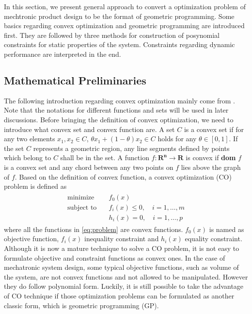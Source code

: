 In this section, we present general approach to convert a optimization problem of mechtronic product design to be the format of geometric programming. Some basics regarding convex optimization and geometric programming are introduced first. They are followed by three methods for construction of posynomial constraints for static properties of the system. Constraints regarding dynamic performance are interpreted in the end. 

\subsection{Mathematical Preliminaries}
The following introduction regarding convex optimization mainly come from \cite{boyd2004convex}. Note that the notations for different functions and sets will be used in later discussions. Before bringing the definition of convex optimization, we need to introduce what convex set and convex function are. A set $C$ is a convex set if for any two elements $x_1, x_2 \in C$, $\theta x_1+(1-\theta) x_2\in C$ holds for any $\theta \in \left[0,1\right]$. If the set $C$ represents a geometric region, any line segments defined by points which belong to $C$ shall be in the set. A function $f : \mathbf{R^n} \to \mathbf{R}$ is convex if \textbf{dom} $f$ is a convex set and any chord between any two points on $f$ lies above the graph of $f$. Based on the definition of convex function, a convex optimization (CO) problem is defined as 
\begin{align}
\begin{split}
\label{eq:problem}
\text{minimize} \quad  & f_0(x) \\
\text{subject to} \quad & f_i(x) \leq 0,\quad i=1,\ldots,m\\
                  & h_i(x) = 0,\quad i=1,\ldots,p
\end{split}
\end{align}
where all the functions in \ref{eq:problem} are convex functions. $f_0(x)$ is named as objective function, $f_i(x)$ inequality constraint and $h_i(x)$ equality constraint. Although it is now a mature technique to solve a CO problem, it is not easy to formulate objective and constraint functions as convex ones. In the case of mechatronic system design, some typical objective functions, such as volume of the system, are not convex functions and not allowed to be manipulated. However they do follow polynomial form. Luckily, it is still possible to take the advantage of CO technique if those optimization problems can be formulated as another classic form, which is geometric programming (GP).

